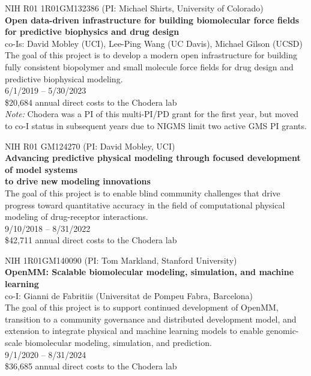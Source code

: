 \documentclass[10pt]{article}
\begin{document}
NIH R01 1R01GM132386 (PI: Michael Shirts, University of Colorado) \\
{\bf Open data-driven infrastructure for building biomolecular force fields for predictive biophysics and drug design} \\
co-Is: David Mobley (UCI), Lee-Ping Wang (UC Davis), Michael Gilson (UCSD) \\
The goal of this project is to develop a modern open infrastructure for building fully consistent biopolymer and small molecule force fields for drug design and predictive biophysical modeling. \\
6/1/2019 -- 5/30/2023 \\
\$20,684 annual direct costs to the Chodera lab\\
\emph{Note:} Chodera was a PI of this multi-PI/PD grant for the first year, but moved to co-I status in subsequent years due to NIGMS limit two active GMS PI grants.

\vspace{1.5ex}

NIH R01 GM124270 (PI: David Mobley, UCI) \\
{\bf Advancing predictive physical modeling through focused development of model systems\\ to drive new modeling innovations}\\
The goal of this project is to enable blind community challenges that drive progress toward quantitative accuracy in the field of computational physical modeling of drug-receptor interactions.\\
9/10/2018 -- 8/31/2022\\
\$42,711 annual direct costs to the Chodera lab

\vspace{1.5ex}

NIH 1R01GM140090 (PI: Tom Markland, Stanford University)\\
{\bf OpenMM: Scalable biomolecular modeling, simulation, and machine learning}\\
co-I: Gianni de Fabritiis (Universitat de Pompeu Fabra, Barcelona)\\
The goal of this project is to support continued development of OpenMM, transition to a community governance and distributed development model, and extension to integrate physical and machine learning models to enable genomic-scale biomolecular modeling, simulation, and prediction.\\
9/1/2020 -- 8/31/2024\\
\$36,685 annual direct costs to the Chodera lab
\end{document}
